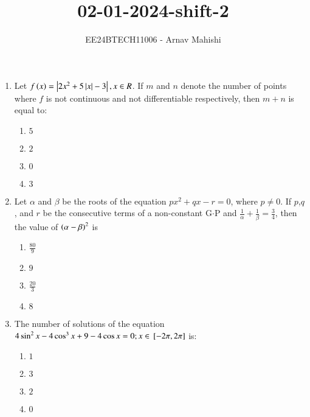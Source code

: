 \documentclass[journal]{IEEEtran}
\begin{document}

\vspace{3cm}

\title{02-01-2024-shift-2}
\author{EE24BTECH11006 - Arnav Mahishi}
{\let\newpage\relax\maketitle}
\begin{enumerate}
\item{
Let $f\left(x\right)=\left\vert2x^2+5\left\vert x\right\vert-3\right\vert,x\in R$. If $m$ and $n$ denote the number of points where $f$ is not continuous and not differentiable respectively, then $m+n$ is equal to:
\begin{multicols}{4}
\begin{enumerate}
\item$5$
\item$2$
\item$0$
\item$3$
\end{enumerate}
\end{multicols}
}
\item{
Let $\alpha$ and $\beta$ be the roots of the equation $px^2+qx-r=0$, where $p\neq 0$. If $p$,$q$, and $r$ be the consecutive terms of a non-constant G$\cdot$P and $\frac{1}{\alpha}+\frac{1}{\beta}=\frac{3}{4}$, then the value of $\left(\alpha -\beta\right)^2$ is 
\begin{multicols}{4}
\begin{enumerate}
\item $\frac{80}{9}$
\item $9$
\item $\frac{20}{3}$
\item $8$
\end{enumerate}
\end{multicols}}
\item{
The number of solutions of the equation $4\sin^2x-4\cos^3x+9-4\cos x=0;x\in{}\left[-2\pi,2\pi\right]$ is: 
\begin{multicols}{4}
\begin{enumerate}
\item $1$
\item $3$
\item $2$
\item $0$
\end{enumerate}
\end{multicols}
}
\end{enumerate}
\end{document}
